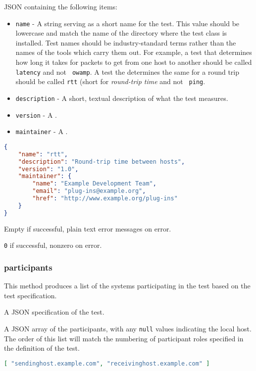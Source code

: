 \documentclass[10pt,titlepage]{article}
\begin{document}
 JSON containing the following items:
\begin{itemize}
\item{\tt name} - A string serving as a short name for the test.  This
  value should be lowercase and match the name of the directory where
  the test class is installed.  Test names should be industry-standard
  terms rather than the names of the tools which carry them out.  For
  example, a test that determines how long it takes for packets to get
  from one host to another should be called {\tt latency} and not {\tt
    owamp}.  A test the determines the same for a round trip should be
  called {\tt rtt} (short for {\it round-trip time} and not {\tt
    ping}.
\item{\tt description} - A short, textual description of what the test
  measures.
\item{\tt version} - A .
\item{\tt maintainer} - A .
\end{itemize}

\example
\begin{lstlisting}[language=json,firstnumber=1]
{
    "name": "rtt",
    "description": "Round-trip time between hosts",
    "version": "1.0",
    "maintainer": {
        "name": "Example Development Team",
        "email": "plug-ins@example.org",
        "href": "http://www.example.org/plug-ins"
    }
}
\end{lstlisting}

 Empty if successful, plain text error
messages on error.

 {\tt 0} if successful, nonzero on error.



\subsubsection{participants}
This method produces a list of the systems participating in the test
based on the test specification.

 A JSON specification of the test.

 A JSON array of the participants, with
any {\tt null} values indicating the local host.  The order of this
list will match the numbering of participant roles specified in the
definition of the test.
\example
\begin{lstlisting}[language=json,firstnumber=1]
[ "sendinghost.example.com", "receivinghost.example.com" ]
\end{lstlisting}
\end{document}
